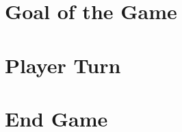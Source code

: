 \documentclass[12pt]{article}
\begin{document}
\begin{mdframed}[style = customFrame]
\begin{multicols*}{2}
\section*{Goal of the Game}
\section*{Player Turn}
\section*{End Game}

\end{multicols*}
\end{mdframed}
\end{document}

